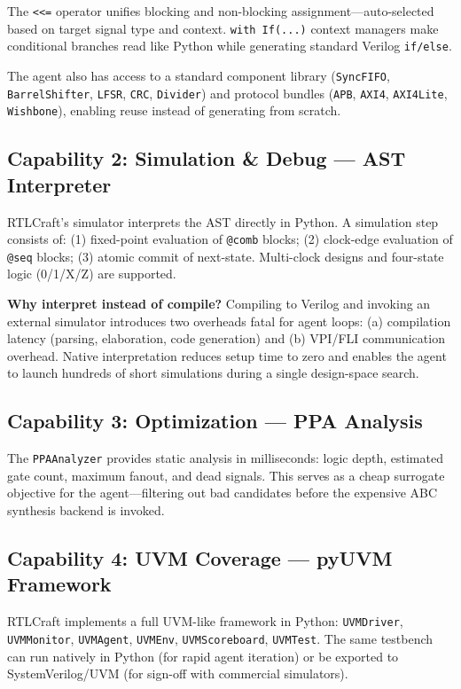 \documentclass[11pt]{article}
\begin{document}
The \texttt{<<=} operator unifies blocking and non-blocking assignment---auto-selected based on target signal type and context. \texttt{with If(...)} context managers make conditional branches read like Python while generating standard Verilog \texttt{if/else}.

The agent also has access to a standard component library (\texttt{SyncFIFO}, \texttt{BarrelShifter}, \texttt{LFSR}, \texttt{CRC}, \texttt{Divider}) and protocol bundles (\texttt{APB}, \texttt{AXI4}, \texttt{AXI4Lite}, \texttt{Wishbone}), enabling reuse instead of generating from scratch.

\subsection{Capability 2: Simulation \& Debug --- AST Interpreter}
\label{sec:cap_sim}

RTLCraft's simulator interprets the AST directly in Python. A simulation step consists of: (1) fixed-point evaluation of \texttt{@comb} blocks; (2) clock-edge evaluation of \texttt{@seq} blocks; (3) atomic commit of next-state. Multi-clock designs and four-state logic (0/1/X/Z) are supported.

\textbf{Why interpret instead of compile?} Compiling to Verilog and invoking an external simulator introduces two overheads fatal for agent loops: (a) compilation latency (parsing, elaboration, code generation) and (b) VPI/FLI communication overhead. Native interpretation reduces setup time to zero and enables the agent to launch hundreds of short simulations during a single design-space search.

\subsection{Capability 3: Optimization --- PPA Analysis}
\label{sec:cap_opt}

The \texttt{PPAAnalyzer} provides static analysis in milliseconds: logic depth, estimated gate count, maximum fanout, and dead signals. This serves as a cheap surrogate objective for the agent---filtering out bad candidates before the expensive ABC synthesis backend is invoked.

\subsection{Capability 4: UVM Coverage --- pyUVM Framework}
\label{sec:cap_uvm}

RTLCraft implements a full UVM-like framework in Python: \texttt{UVMDriver}, \texttt{UVMMonitor}, \texttt{UVMAgent}, \texttt{UVMEnv}, \texttt{UVMScoreboard}, \texttt{UVMTest}. The same testbench can run natively in Python (for rapid agent iteration) or be exported to SystemVerilog/UVM (for sign-off with commercial simulators).
\end{document}
